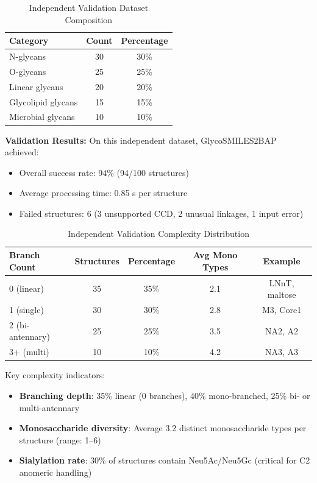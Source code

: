 \documentclass[11pt,a4paper]{article}
\begin{document}
\begin{table}[h]
\centering
\caption{Independent Validation Dataset Composition}
\begin{tabular}{lcc}
\toprule
Category & Count & Percentage \\
\midrule
N-glycans & 30 & 30\% \\
O-glycans & 25 & 25\% \\
Linear glycans & 20 & 20\% \\
Glycolipid glycans & 15 & 15\% \\
Microbial glycans & 10 & 10\% \\
\bottomrule
\end{tabular}
\label{tab:independent_validation}
\end{table}

\textbf{Validation Results:} On this independent dataset, GlycoSMILES2BAP achieved:
\begin{itemize}
\item Overall success rate: 94\% (94/100 structures)
\item Average processing time: 0.85 s per structure
\item Failed structures: 6 (3 unsupported CCD, 2 unusual linkages, 1 input error)
\end{itemize}

\begin{table}[h]
\centering
\caption{Independent Validation Complexity Distribution}
\begin{tabular}{lcccc}
\toprule
Branch Count & Structures & Percentage & Avg Mono Types & Example \\
\midrule
0 (linear) & 35 & 35\% & 2.1 & LNnT, maltose \\
1 (single) & 30 & 30\% & 2.8 & M3, Core1 \\
2 (bi-antennary) & 25 & 25\% & 3.5 & NA2, A2 \\
3+ (multi) & 10 & 10\% & 4.2 & NA3, A3 \\
\bottomrule
\end{tabular}
\label{tab:complexity_branch}
\end{table}

Key complexity indicators:
\begin{itemize}
\item \textbf{Branching depth}: 35\% linear (0 branches), 40\% mono-branched, 25\% bi- or multi-antennary
\item \textbf{Monosaccharide diversity}: Average 3.2 distinct monosaccharide types per structure (range: 1--6)
\item \textbf{Sialylation rate}: 30\% of structures contain Neu5Ac/Neu5Gc (critical for C2 anomeric handling)
\end{itemize}
\end{document}
